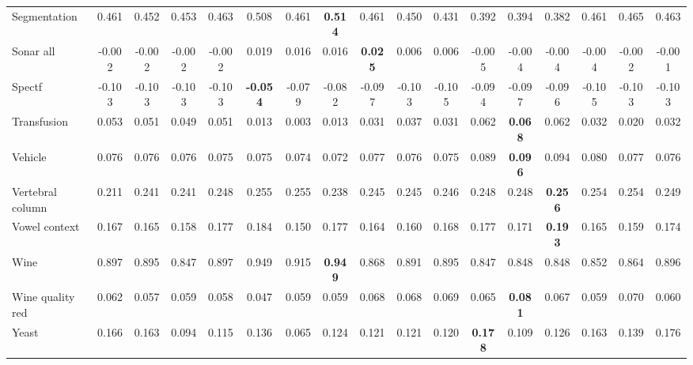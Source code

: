 \begin{tabular}{lcccccccccccccccc}
Segmentation & 0.461 & 0.452 & 0.453 & 0.463 & 0.508 & 0.461 & \textbf{0.514} & 0.461 & 0.450 & 0.431 & 0.392 & 0.394 & 0.382 & 0.461 & 0.465 & 0.463 \\
Sonar all & -0.002 & -0.002 & -0.002 & -0.002 & 0.019 & 0.016 & 0.016 & \textbf{0.025} & 0.006 & 0.006 & -0.005 & -0.004 & -0.004 & -0.004 & -0.002 & -0.001 \\
Spectf & -0.103 & -0.103 & -0.103 & -0.103 & \textbf{-0.054} & -0.079 & -0.082 & -0.097 & -0.103 & -0.105 & -0.094 & -0.097 & -0.096 & -0.105 & -0.103 & -0.103 \\
Transfusion & 0.053 & 0.051 & 0.049 & 0.051 & 0.013 & 0.003 & 0.013 & 0.031 & 0.037 & 0.031 & 0.062 & \textbf{0.068} & 0.062 & 0.032 & 0.020 & 0.032 \\
Vehicle & 0.076 & 0.076 & 0.076 & 0.075 & 0.075 & 0.074 & 0.072 & 0.077 & 0.076 & 0.075 & 0.089 & \textbf{0.096} & 0.094 & 0.080 & 0.077 & 0.076 \\
Vertebral column & 0.211 & 0.241 & 0.241 & 0.248 & 0.255 & 0.255 & 0.238 & 0.245 & 0.245 & 0.246 & 0.248 & 0.248 & \textbf{0.256} & 0.254 & 0.254 & 0.249 \\
Vowel context & 0.167 & 0.165 & 0.158 & 0.177 & 0.184 & 0.150 & 0.177 & 0.164 & 0.160 & 0.168 & 0.177 & 0.171 & \textbf{0.193} & 0.165 & 0.159 & 0.174 \\
Wine & 0.897 & 0.895 & 0.847 & 0.897 & 0.949 & 0.915 & \textbf{0.949} & 0.868 & 0.891 & 0.895 & 0.847 & 0.848 & 0.848 & 0.852 & 0.864 & 0.896 \\
Wine quality red & 0.062 & 0.057 & 0.059 & 0.058 & 0.047 & 0.059 & 0.059 & 0.068 & 0.068 & 0.069 & 0.065 & \textbf{0.081} & 0.067 & 0.059 & 0.070 & 0.060 \\
Yeast & 0.166 & 0.163 & 0.094 & 0.115 & 0.136 & 0.065 & 0.124 & 0.121 & 0.121 & 0.120 & \textbf{0.178} & 0.109 & 0.126 & 0.163 & 0.139 & 0.176 \\
\bottomrule\end{tabular}
